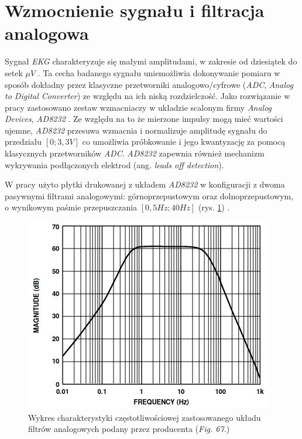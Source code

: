 \newpage

\section{Wzmocnienie sygnału i filtracja analogowa}

Sygnał \textit{EKG} charakteryzuje się małymi amplitudami, w zakresie od dziesiątek do setek $\mu V$ \cite{Zywietz1990}.
Ta cecha badanego sygnału uniemożliwia dokonywanie pomiaru w sposób dokładny przez klasyczne przetworniki analogowo/cyfrowe (\textit{ADC}, \textit{Analog to Digital Converter})
ze względu na ich niską rozdzielczość. Jako rozwiązanie w pracy zastosowano zestaw wzmacniaczy w układzie scalonym firmy \textit{Analog Devices}, \textit{AD8232} \cite{AD8232ds}. 
Ze względu na to że mierzone impulsy mogą mieć wartości ujemne, \textit{AD8232} przesuwa wzmacnia i normalizuje amplitudę sygnału do przedziału $[0; 3,3V]$ co umożliwia 
próbkowanie i jego kwantyzację za pomocą klasycznych przetworników \textit{ADC}. 
\textit{AD8232} zapewnia również mechanizm wykrywania podłączonych elektrod (ang. \textit{leads off detection}).


W pracy użyto płytki drukowanej z układem \textit{AD8232} \cite{AD8232BS} w konfiguracji z dwoma pasywnymi filtrami analogowymi: 
górnoprzepustowym oraz dolnoprzepustowym, o wynikowym paśmie przepuszczania $[0,5 Hz; 40Hz]$ (rys. \ref{fig:afilt}) \cite{AD8232ds}.

\begin{figure}[h!]
    \centering 
    \includegraphics[scale=0.75]{pl/media/afilt.png}
    \caption{Wykres charakterystyki częstotliwościowej zastosowanego układu filtrów analogowych podany przez producenta \cite{AD8232ds}(\textit{Fig. 67.})}
    \label{fig:afilt}
\end{figure}

